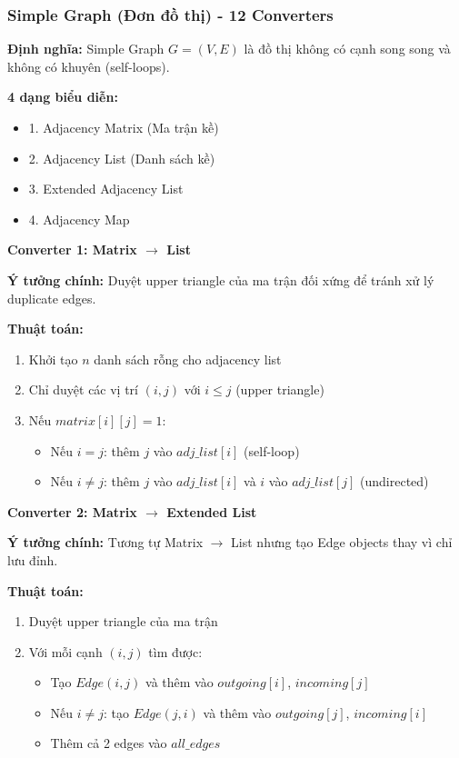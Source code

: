 \documentclass[12pt,a4paper]{article}
\begin{document}
\subsubsection{Simple Graph (Đơn đồ thị) - 12 Converters}

\textbf{Định nghĩa:} Simple Graph $G = (V, E)$ là đồ thị không có cạnh song song và không có khuyên (self-loops).
\vspace{0.5cm}

\textbf{4 dạng biểu diễn:}
\begin{itemize}[label=\textbullet]
    \item 1. Adjacency Matrix (Ma trận kề)
    \item 2. Adjacency List (Danh sách kề)
    \item 3. Extended Adjacency List
    \item 4. Adjacency Map
\end{itemize}

\textbf{Converter 1: Matrix $\rightarrow$ List}

\textbf{Ý tưởng chính:} Duyệt upper triangle của ma trận đối xứng để tránh xử lý duplicate edges.

\textbf{Thuật toán:}
\begin{enumerate}
    \item Khởi tạo $n$ danh sách rỗng cho adjacency list
    \item Chỉ duyệt các vị trí $(i,j)$ với $i \leq j$ (upper triangle)
    \item Nếu $matrix[i][j] = 1$:
    \begin{itemize}
        \item Nếu $i = j$: thêm $j$ vào $adj\_list[i]$ (self-loop)
        \item Nếu $i \neq j$: thêm $j$ vào $adj\_list[i]$ và $i$ vào $adj\_list[j]$ (undirected)
    \end{itemize}
\end{enumerate}
\vspace{0.5cm}

\textbf{Converter 2: Matrix $\rightarrow$ Extended List}

\textbf{Ý tưởng chính:} Tương tự Matrix $\rightarrow$ List nhưng tạo Edge objects thay vì chỉ lưu đỉnh.

\textbf{Thuật toán:}
\begin{enumerate}
    \item Duyệt upper triangle của ma trận
    \item Với mỗi cạnh $(i,j)$ tìm được:
    \begin{itemize}
        \item Tạo $Edge(i,j)$ và thêm vào $outgoing[i]$, $incoming[j]$
        \item Nếu $i \neq j$: tạo $Edge(j,i)$ và thêm vào $outgoing[j]$, $incoming[i]$
        \item Thêm cả 2 edges vào $all\_edges$
    \end{itemize}
\end{enumerate}
\vspace{0.5cm}
\end{document}
